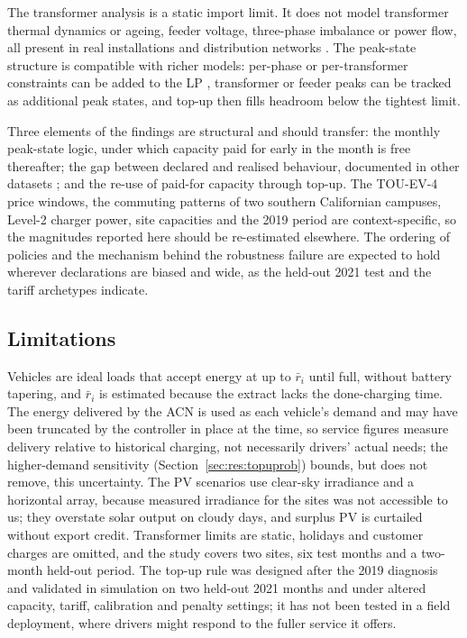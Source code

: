 The transformer analysis is a static import limit. It does not model transformer thermal dynamics or ageing, feeder voltage, three-phase imbalance or power flow, all present in real installations \cite{Lee2021ACN,Lee2021ACNSim} and distribution networks \cite{ClementNyns2010,deHoog2015Network,Gong2012Transformer}. The peak-state structure is compatible with richer models: per-phase or per-transformer constraints can be added to the LP \cite{Lee2021ACN,deHoog2015Network}, transformer or feeder peaks can be tracked as additional peak states, and top-up then fills headroom below the tightest limit.

Three elements of the findings are structural and should transfer: the monthly peak-state logic, under which capacity paid for early in the month is free thereafter; the gap between declared and realised behaviour, documented in other datasets \cite{Kreft2024Predictability,Flammini2019Stats}; and the re-use of paid-for capacity through top-up. The TOU-EV-4 price windows, the commuting patterns of two southern Californian campuses, Level-2 charger power, site capacities and the 2019 period are context-specific, so the magnitudes reported here should be re-estimated elsewhere. The ordering of policies and the mechanism behind the robustness failure are expected to hold wherever declarations are biased and wide, as the held-out 2021 test and the tariff archetypes indicate.

\subsection{Limitations}
Vehicles are ideal loads that accept energy at up to $\bar r_i$ until full, without battery tapering, and $\bar r_i$ is estimated because the extract lacks the done-charging time. The energy delivered by the ACN is used as each vehicle's demand and may have been truncated by the controller in place at the time, so service figures measure delivery relative to historical charging, not necessarily drivers' actual needs; the higher-demand sensitivity (Section~\ref{sec:res:topuprob}) bounds, but does not remove, this uncertainty. The PV scenarios use clear-sky irradiance and a horizontal array, because measured irradiance for the sites was not accessible to us; they overstate solar output on cloudy days, and surplus PV is curtailed without export credit. Transformer limits are static, holidays and customer charges are omitted, and the study covers two sites, six test months and a two-month held-out period. The top-up rule was designed after the 2019 diagnosis and validated in simulation on two held-out 2021 months and under altered capacity, tariff, calibration and penalty settings; it has not been tested in a field deployment, where drivers might respond to the fuller service it offers.

